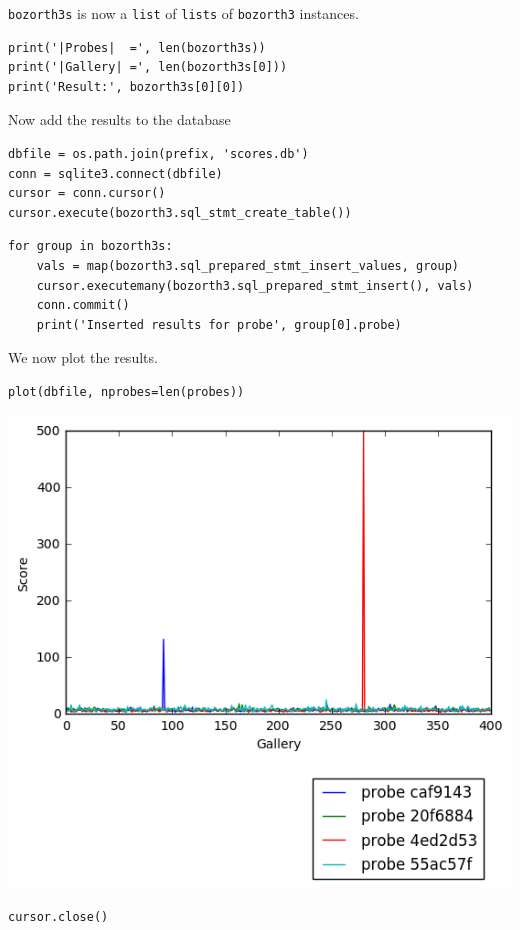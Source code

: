 \texttt{bozorth3s} is now a \texttt{list} of \texttt{lists} of
\texttt{bozorth3} instances.

\begin{lstlisting}
print('|Probes|  =', len(bozorth3s))
print('|Gallery| =', len(bozorth3s[0]))
print('Result:', bozorth3s[0][0])
\end{lstlisting}

Now add the results to the database

\begin{lstlisting}
dbfile = os.path.join(prefix, 'scores.db')
conn = sqlite3.connect(dbfile)
cursor = conn.cursor()
cursor.execute(bozorth3.sql_stmt_create_table())
\end{lstlisting}

\begin{lstlisting}
for group in bozorth3s:
    vals = map(bozorth3.sql_prepared_stmt_insert_values, group)
    cursor.executemany(bozorth3.sql_prepared_stmt_insert(), vals)
    conn.commit()
    print('Inserted results for probe', group[0].probe)
\end{lstlisting}

We now plot the results.

\begin{lstlisting}
plot(dbfile, nprobes=len(probes))
\end{lstlisting}

\includegraphics{fingerprint_matching_files/fingerprint_matching_74_0.png}

\begin{lstlisting}
cursor.close()
\end{lstlisting}
